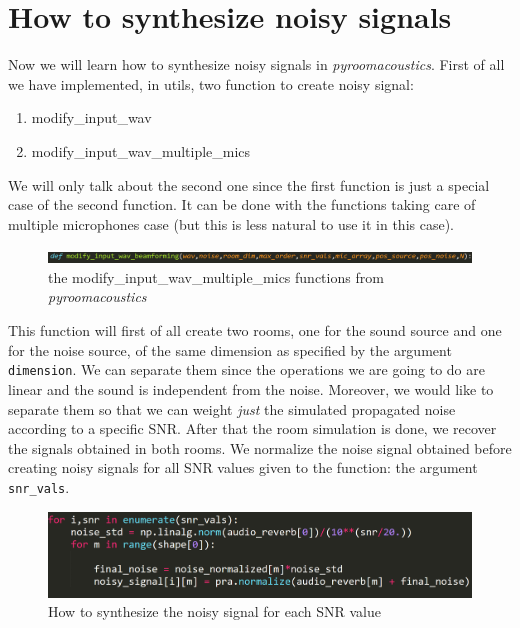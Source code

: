 \documentclass[11pt,a4paper,titlepage]{report}
\providecommand{\tightlist}{%
	\setlength{\itemsep}{0pt}\setlength{\parskip}{0pt}}
\begin{document}

\section{How to synthesize noisy signals}
\label{sec:synth}
\hspace*{0.6cm}
Now we will learn how to synthesize noisy signals in \textit{pyroomacoustics}. First of all we have implemented, in utils, two function to create noisy signal:
\begin{enumerate}
	\tightlist
	\item modify\_input\_wav
	\item modify\_input\_wav\_multiple\_mics
\end{enumerate}
We will only talk about the second one since the first function is just a special case of the second function. It can be done with the functions taking care of multiple microphones case (but this is less natural to use it in this case).
\begin{figure}[h!]
	\centering
	\includegraphics[width=0.7\linewidth]{Rapport9}
	\caption{the modify\_input\_wav\_multiple\_mics functions from \textit{pyroomacoustics}}
	\label{fig:rapport9}
\end{figure}
This function will first of all create two rooms, one for the sound source and one for the noise source, of the same dimension as specified by the argument \texttt{dimension}. We can separate them since the operations we are going to do are linear and the sound is independent from the noise. Moreover, we would like to separate them so that we can weight \emph{just} the simulated propagated noise according to a specific SNR. After that the room simulation is done, we recover the signals obtained in both rooms. We normalize the noise signal obtained before creating noisy signals for all SNR values given to the function: the argument \texttt{snr\_vals}.
\begin{figure}[h!]
	\centering
	\includegraphics[width=0.7\linewidth]{Rapport10}
	\caption{How to synthesize the noisy signal for each SNR value}
	\label{fig:rapport10}
\end{figure}\\
\end{document}
